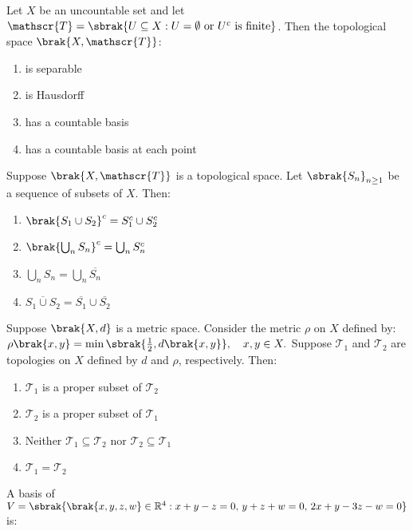   \item Let $X$ be an uncountable set and let $\mathscr{T} = \sbrak{ U \subseteq X : U = \emptyset \text{ or } U^c \text{ is finite} }$. Then the topological space $\brak{X, \mathscr{T}}$:

    \begin{enumerate}
        \item is separable
        \item is Hausdorff
        \item has a countable basis
        \item has a countable basis at each point
    \end{enumerate}

  \item Suppose $\brak{X, \mathscr{T}}$ is a topological space. Let $\sbrak{S_n}_{n \geq 1}$ be a sequence of subsets of $X$. Then:

     \begin{enumerate}
        \item $\brak{S_1 \cup S_2}^c = S_1^c \cup S_2^c$
        \item $\brak{ \bigcup_n S_n }^c = \bigcup_n S_n^c$
        \item $\bigcup_n S_n = \bigcup_n \overline{S_n}$
        \item $\overline{S_1 \cup S_2} = \overline{S_1} \cup \overline{S_2}$
    \end{enumerate}
  
  \item Suppose $\brak{X, d}$ is a metric space. Consider the metric $\rho$ on $X$ defined by:
    $
    \rho\brak{x, y} = \min\sbrak{ \frac{1}{2}, d\brak{x, y} }, \quad x, y \in X.
    $
    Suppose $\mathscr{T}_1$ and $\mathscr{T}_2$ are topologies on $X$ defined by $d$ and $\rho$, respectively. Then:

    \begin{enumerate}
        \item $\mathscr{T}_1$ is a proper subset of $\mathscr{T}_2$
        \item $\mathscr{T}_2$ is a proper subset of $\mathscr{T}_1$
        \item Neither $\mathscr{T}_1 \subseteq \mathscr{T}_2$ nor $\mathscr{T}_2 \subseteq \mathscr{T}_1$
        \item $\mathscr{T}_1 = \mathscr{T}_2$
    \end{enumerate}

  \item A basis of $V = \sbrak{\brak{x, y, z, w} \in \mathbb{R}^4 : x + y - z = 0, \, y + z + w = 0, \, 2x + y - 3z - w = 0 }$ is:

